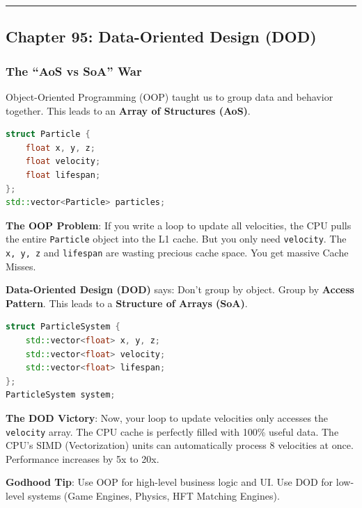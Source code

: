 \begin{center}\rule{0.5\linewidth}{0.5pt}\end{center}

\hypertarget{chapter-95-data-oriented-design-dod}{%
\subsection{Chapter 95: Data-Oriented Design
(DOD)}\label{chapter-95-data-oriented-design-dod}}

\hypertarget{the-aos-vs-soa-war}{%
\subsubsection{The ``AoS vs SoA'' War}\label{the-aos-vs-soa-war}}

Object-Oriented Programming (OOP) taught us to group data and behavior
together. This leads to an \textbf{Array of Structures (AoS)}.

\begin{lstlisting}[language={C++}]
struct Particle {
    float x, y, z;
    float velocity;
    float lifespan;
};
std::vector<Particle> particles;
\end{lstlisting}

\textbf{The OOP Problem}: If you write a loop to update all velocities,
the CPU pulls the entire \passthrough{\lstinline!Particle!} object into
the L1 cache. But you only need \passthrough{\lstinline!velocity!}. The
\passthrough{\lstinline!x, y, z!} and \passthrough{\lstinline!lifespan!}
are wasting precious cache space. You get massive Cache Misses.

\textbf{Data-Oriented Design (DOD)} says: Don't group by object. Group
by \textbf{Access Pattern}. This leads to a \textbf{Structure of Arrays
(SoA)}.

\begin{lstlisting}[language={C++}]
struct ParticleSystem {
    std::vector<float> x, y, z;
    std::vector<float> velocity;
    std::vector<float> lifespan;
};
ParticleSystem system;
\end{lstlisting}

\textbf{The DOD Victory}: Now, your loop to update velocities only
accesses the \passthrough{\lstinline!velocity!} array. The CPU cache is
perfectly filled with 100\% useful data. The CPU's SIMD (Vectorization)
units can automatically process 8 velocities at once. Performance
increases by 5x to 20x.

\textbf{Godhood Tip}: Use OOP for high-level business logic and UI. Use
DOD for low-level systems (Game Engines, Physics, HFT Matching Engines).

